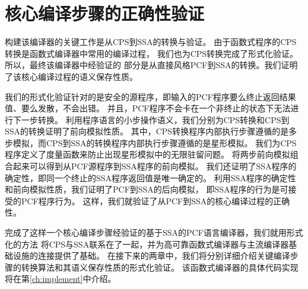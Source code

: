 \section{核心编译步骤的正确性验证}

构建该编译器的关键工作是从CPS到SSA的转换与验证。
由于函数式程序的CPS转换是函数式编译器中常用的编译过程，
我们也为CPS转换完成了形式化验证。所以，最终该编译器中经验证的
部分是从直接风格PCF到SSA的转换。我们证明了该核心编译过程的语义保存性质。

我们的形式化验证针对的是安全的源程序，即输入的PCF程序要么终止返回结果值、要么发散，不会出错。
并且，PCF程序不会卡在一个非终止的状态下无法进行下一步转换。
利用程序语言的小步操作语义，我们分别为CPS转换和CPS到SSA的转换证明了前向模拟性质。
其中，CPS转换程序内部执行步骤遵循的是多步模拟，而CPS到SSA的转换程序内部执行步骤遵循的是星形模拟。
我们为CPS程序定义了度量函数来防止出现星形模拟中的无限驻留问题。
将两步前向模拟组合起来可以得到从PCF源程序到SSA程序的前向模拟。
我们还证明了SSA程序的确定性，即同一个终止的SSA程序返回值是唯一确定的。
利用SSA程序的确定性和前向模拟性质，我们证明了PCF到SSA的后向模拟，
即SSA程序的行为是可接受的PCF程序行为。
这样，我们就验证了从PCF到SSA的核心编译过程的正确性。

完成了这样一个核心编译步骤经验证的基于SSA的PCF语言编译器，我们就用形式化的方法
将CPS与SSA联系在了一起，并为高可靠函数式编译器与主流编译器基础设施的连接提供了基础。
在接下来的两章中，我们将分别详细介绍关键编译步骤的转换算法和其语义保存性质的形式化验证。
该函数式编译器的具体代码实现将在第\ref{ch:implement}中介绍。